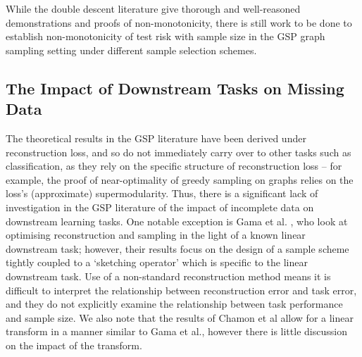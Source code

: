 {While the double descent literature give thorough and well-reasoned demonstrations and proofs of non-monotonicity, there is still work to be done to establish non-monotonicity of test risk with sample size in the GSP graph sampling setting under different sample selection schemes.}


\subsection{The Impact of Downstream Tasks on Missing Data}
The theoretical results in the GSP literature have been derived under reconstruction loss, and so do not immediately carry over to other tasks such as classification, as they rely on the specific structure of reconstruction loss -- for example, the proof of near-optimality of greedy sampling on graphs \cite{chamon2016near} relies on the loss's (approximate) supermodularity. Thus, there is a significant lack of investigation in the GSP literature of the impact of incomplete data on downstream learning tasks. One notable exception is Gama et al. \cite{gama2020rethinking}, who look at optimising reconstruction and sampling in the light of a known linear downstream task; however, their results focus on the design of a sample scheme tightly coupled to a `sketching operator' which is specific to the linear downstream task. Use of a non-standard reconstruction method means it is difficult to interpret the relationship between reconstruction error and task error, and they do not explicitly examine the relationship between task performance and sample size. We also note that the results of Chamon et al \cite{chamon2017greedy} allow for a linear transform in a manner similar to Gama et al., however there is little discussion on the impact of the transform.


